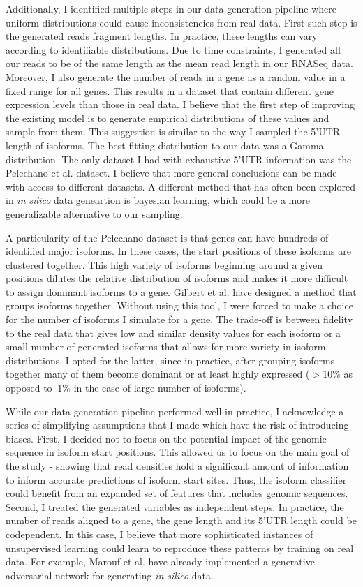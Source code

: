 \documentclass[12pt]{article}
\begin{document}
Additionally, I identified multiple steps in our data generation pipeline where uniform distributions could cause inconsistencies from real data. First such step is the generated reads fragment lengths. In practice, these lengths can vary according to identifiable distributions. Due to time constraints, I generated all our reads to be of the same length as the mean read length in our RNASeq data. Moreover, I also generate the number of reads in a gene as a random value in a fixed range for all genes. This results in a dataset that contain different gene expression levels than those in real data. I believe that the first step of improving the existing model is to generate empirical distributions of these values and sample from them. This suggestion is similar to the way I sampled the 5'UTR length of isoforms. The best fitting distribution to our data was a Gamma distribution. The only dataset I had with exhaustive 5'UTR information was the Pelechano et al. \cite{Pelechano2013} dataset. I believe that more general conclusions can be made with access to different datasets. A different method that has often been explored \cite{Lopez2018} in \textit{in silico} data geneartion is bayesian learning, which could be a more generalizable alternative to our sampling. 

A particularity of the Pelechano \cite{Pelechano2013} dataset is that genes can have hundreds of identified major isoforms. In these cases, the start positions of these isoforms are clustered together. This high variety of isoforms beginning around a given positions dilutes the relative distribution of isoforms and makes it more difficult to assign dominant isoforms to a gene. Gilbert et al. have designed a method that groups isoforms together. Without using this tool, I were forced to make a choice for the number of isoforms I  simulate for a gene. The trade-off is between fidelity to the real data that gives low and similar density values for each isoform or a small number of generated isoforms that allows for more variety in isoform distributions. I opted for the latter, since in practice, after grouping isoforms together many of them become dominant or at least highly expressed ($>10\%$ as opposed to $~1\%$ in the case of large number of isoforms). 

While our data generation pipeline performed well in practice, I acknowledge a series of simplifying assumptions that I made which have the risk of introducing biases. First, I decided not to focus on the potential impact of the genomic sequence in isoform start positions. This allowed us to focus on the main goal of the study - showing that read densities hold a significant amount of information to inform accurate predictions of isoform start sites. Thus, the isoform classifier could benefit from an expanded set of features that includes genomic sequences. Second, I treated the generated variables as independent steps. In practice, the number of reads aligned to a gene, the gene length and its 5'UTR length could be codependent. In this case, I believe that more sophisticated instances of unsupervised learning could learn to reproduce these patterns by training on real data. For example, Marouf et al. \cite{Marouf2020} have already implemented a generative adversarial network for generating \textit{in silico} data.
\end{document}
